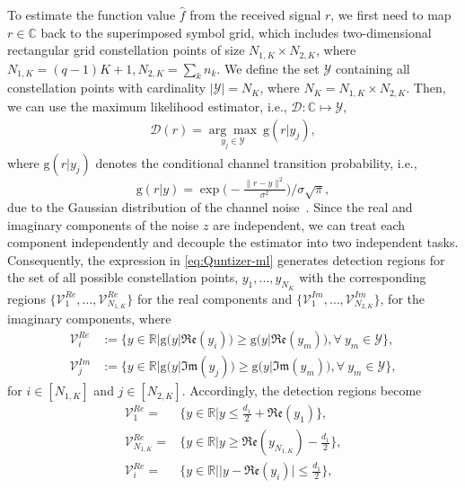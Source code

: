 \documentclass[journal,12pt,onecolumn,draftclsnofoot]{IEEEtran}
\theoremstyle{definition}
\begin{document}
To estimate the function value $\hat{f}$ from the received signal $r$,  we first need to map $r \in \mathbb{C}$ back to the superimposed symbol grid, which includes two-dimensional rectangular grid constellation points of size $N_{1, K} \times N_{2, K}$, where $N_{1, K} = (q-1)K+1, N_{2, K}=\sum_{k}n_k$. We define the set  $\mathcal{Y}$ containing all constellation points with cardinality $|\mathcal{Y}| = N_K$, where $N_K=N_{1,K} \times N_{2,K}$.
Then, we can use the maximum likelihood estimator, i.e., $\mathscr{D}: \mathbb{C} \mapsto \mathcal{Y}$, 
\begin{align}
    \label{eq:Quntizer-ml}
    \mathscr{D}(r) =  \underset{y_j \in \mathcal{Y}}{\arg\max}~\mathrm{g}(r|y_j),
\end{align}
where $\mathrm{g}(r|y_j)$ denotes the conditional channel transition probability, i.e.,  $$ \mathrm{g}(r|y) = { \exp{\Big(-\tfrac{\|r-y\|^2}{\sigma^2}}\Big)}/{\sigma\sqrt{\pi}},$$ due to the Gaussian distribution of the channel noise~\cite{saeed2023ChannelComp}. Since the real and imaginary components of the noise $z$ are independent, we can treat each component independently and decouple the estimator into two independent tasks. Consequently, the expression in \eqref{eq:Quntizer-ml} generates detection regions for the set
of all possible constellation points, $y_1, \ldots, y_{N_K}$ with the
corresponding regions $\{\mathcal{V}_1^{Re}, \ldots, \mathcal{V}^{Re}_{N_{1,K}}\}$ for the real components and $\{\mathcal{V}_1^{Im}, \ldots, \mathcal{V}^{Im}_{N_{2,K}}\}$, for the imaginary components,  where 
\begin{align}
     \nonumber
    \mathcal{V}_i^{Re}& := \{y \in \mathbb{R}|\mathrm{g}\big(y|\mathfrak{Re}(y_i)\big) \geq \mathrm{g}\big(y|\mathfrak{Re}(y_m)\big), \forall~y_m \in \mathcal{Y}\}, \\ \nonumber
    \mathcal{V}_j^{Im}& := \{y \in \mathbb{R}|\mathrm{g}\big(y|\mathfrak{Im}(y_j)\big) \geq \mathrm{g}\big(y|\mathfrak{Im}(y_m)\big), \forall~y_m \in \mathcal{Y}\},
\end{align}
for $i\in [N_{1,K}]$ and $j\in [N_{2,K}]$. Accordingly, the detection regions become 
\begin{subequations}
\label{eq:Voronoi_RE}
    \begin{align}
    \mathcal{V}_1^{Re} = &\Big\{y\in \mathbb{R}| y \leq \frac{d_1}{2}+\mathfrak{Re}(y_1)\Big\}, \\\mathcal{V}_{N_{1,K}}^{Re} =& \Big\{y\in \mathbb{R}| y \geq \mathfrak{Re}(y_{N_{1,K}})-\frac{d_1}{2}\Big\}, \\
      \mathcal{V}_i^{Re} =& \Big\{y\in \mathbb{R}| |y - \mathfrak{Re}(y_i)|\leq \frac{d_1}{2}\Big\},
\end{align}
\end{subequations}
\end{document}
